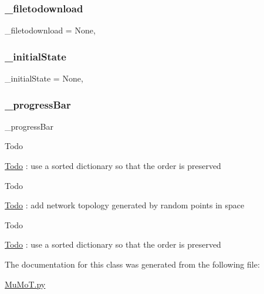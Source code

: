 \subsubsection{\texorpdfstring{\+\_\+filetodownload}{\_filetodownload}}
{\footnotesize\ttfamily \+\_\+filetodownload = None\hspace{0.3cm}{\ttfamily [static]}, {\ttfamily [private]}}

\mbox{\label{class_mu_mo_t_1_1_mu_mo_tmultiagent_controller_a8afeb8cf5705c6b521f7d6658dab955b}} 
\subsubsection{\texorpdfstring{\+\_\+initial\+State}{\_initialState}}
{\footnotesize\ttfamily \+\_\+initial\+State = None\hspace{0.3cm}{\ttfamily [static]}, {\ttfamily [private]}}

\mbox{\label{class_mu_mo_t_1_1_mu_mo_tmultiagent_controller_a018864aa22d2adb0d3958fb0adbce8e2}} 
\subsubsection{\texorpdfstring{\+\_\+progress\+Bar}{\_progressBar}}
{\footnotesize\ttfamily \+\_\+progress\+Bar\hspace{0.3cm}{\ttfamily [private]}}

\begin{DoxyRefDesc}{Todo}
\item[\hyperlink{todo__todo000021}{Todo}]\+: use a sorted dictionary so that the order is preserved \end{DoxyRefDesc}
\begin{DoxyRefDesc}{Todo}
\item[\hyperlink{todo__todo000022}{Todo}]\+: add network topology generated by random points in space \end{DoxyRefDesc}
\begin{DoxyRefDesc}{Todo}
\item[\hyperlink{todo__todo000023}{Todo}]\+: use a sorted dictionary so that the order is preserved \end{DoxyRefDesc}


The documentation for this class was generated from the following file\+:\begin{DoxyCompactItemize}
\item 
\hyperlink{_mu_mo_t_8py}{Mu\+Mo\+T.\+py}\end{DoxyCompactItemize}
